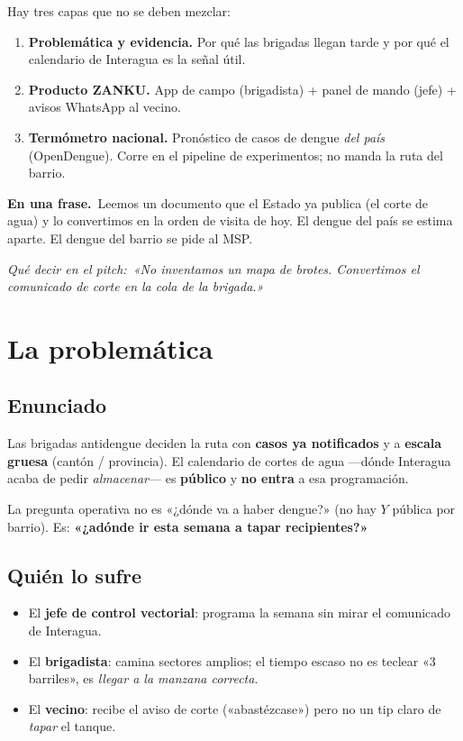 \documentclass[11pt,a4paper]{article}
\newcommand{\nota}[2]{%
  \par\vspace{4pt}\noindent
  \colorbox{panelvs}{\parbox{\dimexpr\linewidth-2\fboxsep}{%
  \textbf{\color{azulvs}#1.}\ #2}}\par\vspace{4pt}}
\newcommand{\pitch}[1]{%
  \par\vspace{2pt}\noindent
  \textit{\textcolor{azulvs}{Qué decir en el pitch:}\ #1}\par\vspace{4pt}}
\begin{document}
Hay tres capas que no se deben mezclar:

\begin{enumerate}[leftmargin=1.4em]
  \item \textbf{Problemática y evidencia.} Por qué las brigadas llegan
        tarde y por qué el calendario de Interagua es la señal útil.
  \item \textbf{Producto ZANKU.} App de campo (brigadista) + panel de
        mando (jefe) + avisos WhatsApp al vecino.
  \item \textbf{Termómetro nacional.} Pronóstico de casos de dengue
        \emph{del país} (OpenDengue). Corre en el pipeline de
        experimentos; no manda la ruta del barrio.
\end{enumerate}

\nota{En una frase}{Leemos un documento que el Estado ya publica (el
corte de agua) y lo convertimos en la orden de visita de hoy. El dengue
del país se estima aparte. El dengue del barrio se pide al MSP.}

\pitch{«No inventamos un mapa de brotes. Convertimos el comunicado de
corte en la cola de la brigada.»}

\section{La problemática}

\subsection{Enunciado}

Las brigadas antidengue deciden la ruta con \textbf{casos ya notificados}
y a \textbf{escala gruesa} (cantón / provincia). El calendario de cortes
de agua ---dónde Interagua acaba de pedir \emph{almacenar}--- es
\textbf{público} y \textbf{no entra} a esa programación.

La pregunta operativa no es «¿dónde va a haber dengue?» (no hay $Y$
pública por barrio). Es: \textbf{«¿adónde ir esta semana a tapar
recipientes?»}

\subsection{Quién lo sufre}

\begin{itemize}[leftmargin=1.4em]
  \item El \textbf{jefe de control vectorial}: programa la semana sin
        mirar el comunicado de Interagua.
  \item El \textbf{brigadista}: camina sectores amplios; el tiempo
        escaso no es teclear «3 barriles», es \emph{llegar a la manzana
        correcta}.
  \item El \textbf{vecino}: recibe el aviso de corte («abastézcase»)
        pero no un tip claro de \emph{tapar} el tanque.
\end{itemize}
\end{document}
